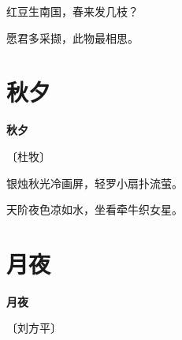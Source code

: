 \documentclass[12pt,UTF-8,openany,fontset=none]{ctexbook}
\begin{document}
    \vspace{18pt}

\begin{center}
    \begin{Large}

        红豆生南国，春来发几枝？

        愿君多采撷，此物最相思。

    \end{Large}

\end{center}

\vspace{8pt}
\clearpage

\section{秋夕}


\begin{center}
    {\bfseries 秋夕}

    \vspace{18pt}

    \begin{large}\xuwen
        〔杜牧〕
    \end{large}

\end{center}

    \vspace{18pt}

\begin{center}
    \begin{Large}

        银烛秋光冷画屏，轻罗小扇扑流萤。

        天阶夜色凉如水，坐看牵牛织女星。

    \end{Large}

\end{center}

\vspace{8pt}
\clearpage

\section{月夜}


\begin{center}
    {\bfseries 月夜}

    \vspace{18pt}

    \begin{large}\xuwen
        〔刘方平〕
    \end{large}

\end{center}
\end{document}
